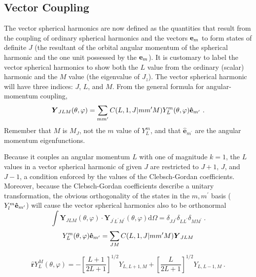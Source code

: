 \documentclass[12pt,a4paper]{article}
\renewcommand{\vec}[1]{\boldsymbol{#1}}
\newcommand{\dif}{\mathrm{d}}
\begin{document}
\subsection{Vector Coupling}
\cite{arfken} The vector spherical harmonics are now defined as the quantities that result from the coupling of ordinary spherical harmonics and the vectors $ \vec{\rm e}_m$ to form states of definite $J$ (the resultant of the orbital angular momentum of the spherical harmonic and the one unit possessed by the $ \vec{\rm e}_m$). It is customary to label the vector spherical harmonics to show both the $L$ value from the ordinary (scalar) harmonic and the $M$ value (the eigenvalue of $J_z$). The vector spherical harmonic will have three indices: $J$, $L$, and $M$. From the general formula for angular-momentum coupling,
\begin{equation}
\vec{Y}_{JLM}(\theta, \varphi) = \sum_{m m^\prime} C(L, 1, J|m m^\prime M) Y^m_L(\theta, \varphi)  \vec{\hat{\rm e}}_{m^\prime} ~.
\end{equation}
Remember that $M$ is $M_J$, not the $m$ value of $Y_L^m$, and that $\vec{\hat{e}}_{m^\prime}$ are the angular momentum eigenfunctions. 

Because it couples an angular momentum $L$ with one of magnitude $k = 1$, the $L$ values in a vector spherical harmonic of given $J$ are restricted to $J + 1$, $J$, and $J -1$, a condition enforced by the values of the Clebsch-Gordan coefficients. Moreover, because the Clebsch-Gordan coefficients describe a unitary transformation, the obvious orthogonality of the states in the $m, m^\prime$ basis ($Y_l^m \vec{\hat{\rm e}}_{m^\prime}$) will cause the vector spherical harmonics also to be orthonormal
\begin{equation}
\int \vec{Y}_{JLM}(\theta, \varphi) \cdot \vec{Y}_{J^\prime L^\prime M^\prime}(\theta, \varphi) \dif \Omega = \delta_{JJ^\prime} \delta_{LL^\prime} \delta_{MM^\prime} ~.
\end{equation}
\begin{equation}
Y_L^m(\theta, \varphi) \vec{\hat{\rm e}}_{m^\prime} = \sum_{JM} C(L, 1, J|m m^\prime M)\vec{Y}_{JLM}
\end{equation}

\begin{equation}
\vec{\hat{r}} Y_L^M(\theta, \varphi) = -\left[\dfrac{L+1}{2L+1} \right]^{1/2} Y_{L, L+1, M} + \left[\dfrac{L}{2L+1} \right]^{1/2} Y_{L, L-1, M} ~.
\end{equation}
\end{document}
